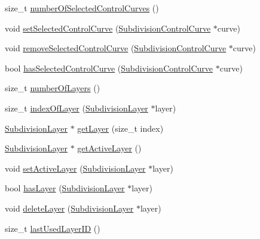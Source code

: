 \begin{DoxyCompactItemize}
\item 
size\-\_\-t \hyperlink{classShipCAD_1_1SubdivisionSurface_a174e6e97b72c037693369e3716522ced}{number\-Of\-Selected\-Control\-Curves} ()
\item 
void \hyperlink{classShipCAD_1_1SubdivisionSurface_a5614a6ea5e1b67ec516328d64574cd9e}{set\-Selected\-Control\-Curve} (\hyperlink{classShipCAD_1_1SubdivisionControlCurve}{Subdivision\-Control\-Curve} $\ast$curve)
\item 
void \hyperlink{classShipCAD_1_1SubdivisionSurface_a1666628c8232ba11d386641fa7980ed7}{remove\-Selected\-Control\-Curve} (\hyperlink{classShipCAD_1_1SubdivisionControlCurve}{Subdivision\-Control\-Curve} $\ast$curve)
\item 
bool \hyperlink{classShipCAD_1_1SubdivisionSurface_acdfbfb4870bf517cd075fdf51a0de997}{has\-Selected\-Control\-Curve} (\hyperlink{classShipCAD_1_1SubdivisionControlCurve}{Subdivision\-Control\-Curve} $\ast$curve)
\item 
size\-\_\-t \hyperlink{classShipCAD_1_1SubdivisionSurface_ad9d00dfc848975306c43305e13e57ebe}{number\-Of\-Layers} ()
\item 
size\-\_\-t \hyperlink{classShipCAD_1_1SubdivisionSurface_accb1e8604e44f491f84e9fb77d1ab5c7}{index\-Of\-Layer} (\hyperlink{classShipCAD_1_1SubdivisionLayer}{Subdivision\-Layer} $\ast$layer)
\item 
\hyperlink{classShipCAD_1_1SubdivisionLayer}{Subdivision\-Layer} $\ast$ \hyperlink{classShipCAD_1_1SubdivisionSurface_a24b230e51a0c5fb3e7f51d0e2340eb9f}{get\-Layer} (size\-\_\-t index)
\item 
\hyperlink{classShipCAD_1_1SubdivisionLayer}{Subdivision\-Layer} $\ast$ \hyperlink{classShipCAD_1_1SubdivisionSurface_a490d7a6fef79ba56fd36395208b46ba5}{get\-Active\-Layer} ()
\item 
void \hyperlink{classShipCAD_1_1SubdivisionSurface_a69bafa71111e562a52a089be99b47871}{set\-Active\-Layer} (\hyperlink{classShipCAD_1_1SubdivisionLayer}{Subdivision\-Layer} $\ast$layer)
\item 
bool \hyperlink{classShipCAD_1_1SubdivisionSurface_aef9fe9a74054b54292f7f64e0589743c}{has\-Layer} (\hyperlink{classShipCAD_1_1SubdivisionLayer}{Subdivision\-Layer} $\ast$layer)
\item 
void \hyperlink{classShipCAD_1_1SubdivisionSurface_a3f0dac49106056562a8b675c61918abe}{delete\-Layer} (\hyperlink{classShipCAD_1_1SubdivisionLayer}{Subdivision\-Layer} $\ast$layer)
\item 
size\-\_\-t \hyperlink{classShipCAD_1_1SubdivisionSurface_a46966d7372d20e563fddc48d6bbcab8a}{last\-Used\-Layer\-I\-D} ()

\end{DoxyCompactItemize}
